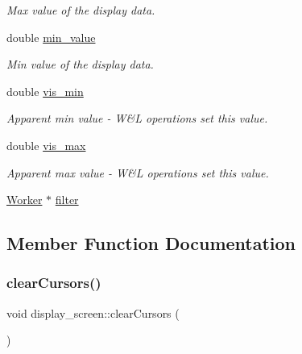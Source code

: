 \begin{DoxyCompactItemize}
\begin{DoxyCompactList}\small\item\em Max value of the display data. \end{DoxyCompactList}\item 
\mbox{\label{classdisplay__screen_a3091e35b28219274fe9ffd8e8dc68c40}} 
double \mbox{\hyperlink{classdisplay__screen_a3091e35b28219274fe9ffd8e8dc68c40}{min\+\_\+value}}
\begin{DoxyCompactList}\small\item\em Min value of the display data. \end{DoxyCompactList}\item 
\mbox{\label{classdisplay__screen_a0a040ebfadeba044ee2d887c43b37425}} 
double \mbox{\hyperlink{classdisplay__screen_a0a040ebfadeba044ee2d887c43b37425}{vis\+\_\+min}}
\begin{DoxyCompactList}\small\item\em Apparent min value -\/ W\&L operations set this value. \end{DoxyCompactList}\item 
\mbox{\label{classdisplay__screen_a100a772813944bb4a41feab579ae11d8}} 
double \mbox{\hyperlink{classdisplay__screen_a100a772813944bb4a41feab579ae11d8}{vis\+\_\+max}}
\begin{DoxyCompactList}\small\item\em Apparent max value -\/ W\&L operations set this value. \end{DoxyCompactList}\item 
\mbox{\hyperlink{classWorker}{Worker}} $\ast$ \mbox{\hyperlink{classdisplay__screen_a54ed0638f240e4a044d9d4376233ec71}{filter}}
\end{DoxyCompactItemize}


\subsection{Member Function Documentation}
\mbox{\label{classdisplay__screen_aedda58c57969f054fb9bedd1ed01b62c}} 
\subsubsection{\texorpdfstring{clear\+Cursors()}{clearCursors()}}
{\footnotesize\ttfamily void display\+\_\+screen\+::clear\+Cursors (\begin{DoxyParamCaption}{ }\end{DoxyParamCaption})\hspace{0.3cm}{\ttfamily [pure virtual]}}

